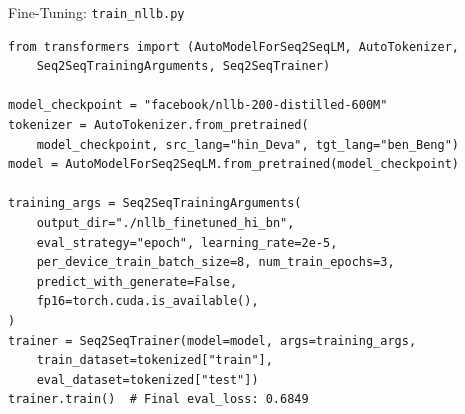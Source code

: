 \documentclass[aspectratio=169]{beamer}
\begin{document}
\begin{frame}[fragile]{Fine-Tuning: \texttt{train\_nllb.py}}
\begin{lstlisting}[style=pythonstyle]
from transformers import (AutoModelForSeq2SeqLM, AutoTokenizer,
    Seq2SeqTrainingArguments, Seq2SeqTrainer)

model_checkpoint = "facebook/nllb-200-distilled-600M"
tokenizer = AutoTokenizer.from_pretrained(
    model_checkpoint, src_lang="hin_Deva", tgt_lang="ben_Beng")
model = AutoModelForSeq2SeqLM.from_pretrained(model_checkpoint)

training_args = Seq2SeqTrainingArguments(
    output_dir="./nllb_finetuned_hi_bn",
    eval_strategy="epoch", learning_rate=2e-5,
    per_device_train_batch_size=8, num_train_epochs=3,
    predict_with_generate=False,
    fp16=torch.cuda.is_available(),
)
trainer = Seq2SeqTrainer(model=model, args=training_args,
    train_dataset=tokenized["train"],
    eval_dataset=tokenized["test"])
trainer.train()  # Final eval_loss: 0.6849
\end{lstlisting}
\end{frame}
\end{document}
